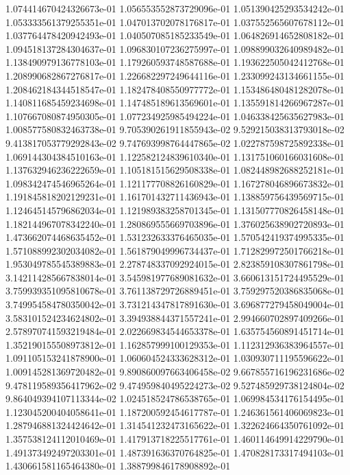 1.074414670424326673e-01
1.056553552873729096e-01
1.051390425293534242e-01
1.053333561379255351e-01
1.047013702078176817e-01
1.037552565607678112e-01
1.037764478420942493e-01
1.040507085185233549e-01
1.064826914652808182e-01
1.094518137284304637e-01
1.096830107236275997e-01
1.098899032640989482e-01
1.138490979136778103e-01
1.179260593748587688e-01
1.193622505042412768e-01
1.208990682867276817e-01
1.226682297249644116e-01
1.233099243134661155e-01
1.208462184344518547e-01
1.182478408550977772e-01
1.153486480481282078e-01
1.140811685459234698e-01
1.147485189613569601e-01
1.135591814266967287e-01
1.107667080874950305e-01
1.077234925985494224e-01
1.046338425635627983e-01
1.008577580832463738e-01
9.705390261911855943e-02
9.529215038313793018e-02
9.413817053779292843e-02
9.747693998764447865e-02
1.022787598725892338e-01
1.069144304384510163e-01
1.122582124839610340e-01
1.131751060166031608e-01
1.137632946236222659e-01
1.105181515629508338e-01
1.082448982688252181e-01
1.098342474546965264e-01
1.121177708826160829e-01
1.167278046896673832e-01
1.191845818202129231e-01
1.161701432711436943e-01
1.138859756439569715e-01
1.124645145796862034e-01
1.121989383258701345e-01
1.131507770826458148e-01
1.182144967078342240e-01
1.280869555669703896e-01
1.376025638902720893e-01
1.473662074468635452e-01
1.531232633376465035e-01
1.570542419374995335e-01
1.571088992302034082e-01
1.561879049996734437e-01
1.712829972501766218e-01
1.953049785545389883e-01
2.278748337092924015e-01
2.823859108307861798e-01
3.142114285667838014e-01
3.545981977689081632e-01
3.660613151724495529e-01
3.759939351095810678e-01
3.761138729726889451e-01
3.759297520386835068e-01
3.749954584780350042e-01
3.731214347817891630e-01
3.696877279458049004e-01
3.583101524234624802e-01
3.394938844371557241e-01
2.994660702897409266e-01
2.578970741593219484e-01
2.022669834544653378e-01
1.635754560891451714e-01
1.352190155508973812e-01
1.162857999100129353e-01
1.112312936383964557e-01
1.091105153241878900e-01
1.060604524333628312e-01
1.030930711195596622e-01
1.009145281369720482e-01
9.890860097663406458e-02
9.667855716196231686e-02
9.478119589356417962e-02
9.474959840495224273e-02
9.527485929738124804e-02
9.864049394107113344e-02
1.024518524786538765e-01
1.069984534176154495e-01
1.123045200404058641e-01
1.187200592454617787e-01
1.246361561406069823e-01
1.287946881324424642e-01
1.314541232473165622e-01
1.322624664350761092e-01
1.357538124112010469e-01
1.417913718225517761e-01
1.460114649914229790e-01
1.491373492497203301e-01
1.487391636370764825e-01
1.470828173317494103e-01
1.430661581165464380e-01
1.388799846178908892e-01
